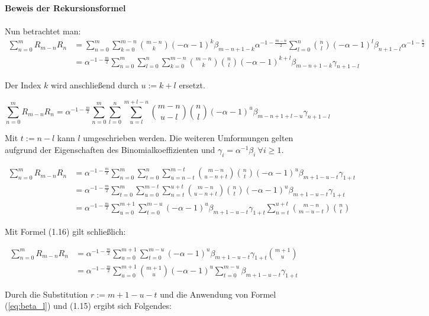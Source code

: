\documentclass[a4paper, 11pt]{scrreprt}
\begin{document}
\textbf{Beweis der Rekursionsformel}\\\\
Nun betrachtet man:
\begin{align*}
\sum_{n=0}^m R_{m-n} R_n 
&= \sum_{n=0}^m \sum_{k=0}^{m-n} \binom{m-n}{k} (-\alpha -1)^k \beta_{m-n+1-k} \alpha^{-1-\frac{m-n}{2}} \sum_{l=0}^n \binom{n}{l} (-\alpha -1)^l \beta_{n+1-l} \alpha^{-1-\frac{n}{2}} \\
&= \alpha^{-1-\frac{m}{2}} \sum_{n=0}^m \sum_{l=0}^n \sum_{k=0}^{m-n} \binom{m-n}{k}  \binom{n}{l} (-\alpha -1)^{k+l} \beta_{m-n+1-k} \gamma_{n+1-l}	
\end{align*}

Der Index $k$ wird anschließend durch $u:=k+l$ ersetzt.

\[\sum_{n=0}^m R_{m-n} R_n = \alpha^{-1-\frac{m}{2}} \sum_{n=0}^m \sum_{l=0}^n \sum_{u=l}^{m+l-n} \binom{m-n}{u-l}  \binom{n}{l} (-\alpha -1)^u \beta_{m-n+1+l-u} \gamma_{n+1-l}\]

Mit $t:=n-l$ kann $l$ umgeschrieben werden. Die weiteren Umformungen gelten aufgrund der Eigenschaften des Binomialkoeffizienten und $ \gamma_i=\alpha^{-1} \beta_i ~\forall i\geq1$.

\begin{align*}
\sum_{n=0}^m R_{m-n} R_n 
&= \alpha^{-1-\frac{m}{2}} \sum_{n=0}^m \sum_{t=0}^n \sum_{u=n-t}^{m-t} \binom{m-n}{u-n+t}  \binom{n}{t} (-\alpha -1)^u \beta_{m+1-u-t} \gamma_{1+t} \\
&= \alpha^{-1-\frac{m}{2}} \sum_{t=0}^m \sum_{u=0}^{m-t} \sum_{n=t}^{u+t} \binom{m-n}{u-n+t}  \binom{n}{t} (-\alpha -1)^u \beta_{m+1-u-t} \gamma_{1+t} \\
&= \alpha^{-1-\frac{m}{2}} \sum_{u=0}^{m+1} \sum_{t=0}^{m-u} (-\alpha -1)^u \beta_{m+1-u-t} \gamma_{1+t} \sum_{n=t}^{u+t} \binom{m-n}{m-u-t}  \binom{n}{t}
\end{align*}

Mit Formel (1.16) gilt schließlich:

\begin{align*}
\sum_{n=0}^m R_{m-n} R_n 
&= \alpha^{-1-\frac{m}{2}} \sum_{u=0}^{m+1} \sum_{t=0}^{m-u} (-\alpha -1)^u \beta_{m+1-u-t} \gamma_{1+t} \binom{m+1}{u} \\
&= \alpha^{-1-\frac{m}{2}} \sum_{u=0}^{m+1} \binom{m+1}{u} (-\alpha -1)^u \sum_{t=0}^{m-u} \beta_{m+1-u-t} \gamma_{1+t}
\end{align*}

Durch die Substitution $r := m+1-u-t$ und die Anwendung von Formel (\ref{eq:beta_l}) und (1.15) ergibt sich Folgendes:
\end{document}
